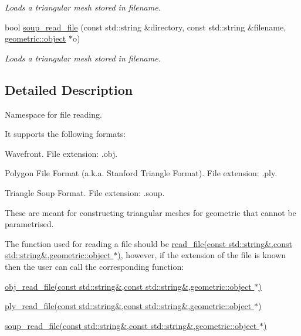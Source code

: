 \begin{DoxyCompactItemize}
\begin{DoxyCompactList}\small\item\em Loads a triangular mesh stored in {\itshape filename}. \end{DoxyCompactList}\item 
bool \hyperlink{namespacephysim_1_1input_a8e2fe050e529636908811d164cd2c5ee}{soup\+\_\+read\+\_\+file} (const std\+::string \&directory, const std\+::string \&filename, \hyperlink{classphysim_1_1geometric_1_1object}{geometric\+::object} $\ast$o)
\begin{DoxyCompactList}\small\item\em Loads a triangular mesh stored in {\itshape filename}. \end{DoxyCompactList}\end{DoxyCompactItemize}


\subsection{Detailed Description}
Namespace for file reading. 

It supports the following formats\+:
\begin{DoxyItemize}
\item Wavefront. File extension\+: .obj.
\item Polygon File Format (a.\+k.\+a. Stanford Triangle Format). File extension\+: .ply.
\item Triangle Soup Format. File extension\+: .soup.
\end{DoxyItemize}

These are meant for constructing triangular meshes for geometric that cannot be parametrised.

The function used for reading a file should be \hyperlink{namespacephysim_1_1input_a7f2e283bc4dea0626ffcdb51ba9eaf35}{read\+\_\+file(const std\+::string\&,const std\+::string\&,geometric\+::object $\ast$)}, however, if the extension of the file is known then the user can call the corresponding function\+:
\begin{DoxyItemize}
\item \hyperlink{namespacephysim_1_1input_ab6a152c0cdac6c0041f0c3402ffc568e}{obj\+\_\+read\+\_\+file(const std\+::string\&,const std\+::string\&,geometric\+::object $\ast$)}
\item \hyperlink{namespacephysim_1_1input_a275d779352762c55a24c0e6b8e9dcc26}{ply\+\_\+read\+\_\+file(const std\+::string\&,const std\+::string\&,geometric\+::object $\ast$)}
\item \hyperlink{namespacephysim_1_1input_a8e2fe050e529636908811d164cd2c5ee}{soup\+\_\+read\+\_\+file(const std\+::string\&,const std\+::string\&,geometric\+::object $\ast$)} 
\end{DoxyItemize}

